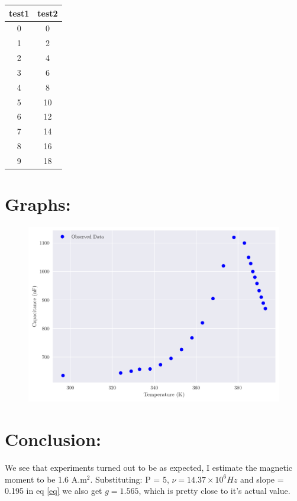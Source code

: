 \documentclass{../_layouts/ieeeconf}
\begin{document}
\begin{table}[H]
    \centering
    \begin{tabular}{@{}cc@{}}
        \toprule
        ﻿test1 & test2 \\
        \midrule
        0 & 0 \\
        1 & 2 \\
        2 & 4 \\
        3 & 6 \\
        4 & 8 \\
        5 & 10 \\
        6 & 12 \\
        7 & 14 \\
        8 & 16 \\
        9 & 18 \\
        \bottomrule
    \end{tabular}
\end{table}
\section{Graphs:}
\begin{figure}[H]
\centering
\includegraphics[width = \columnwidth]{../_assets/Capacitance.pdf}
\end{figure}
\section{Conclusion:}
We see that experiments turned out to be as expected, I estimate the magnetic moment to be 1.6 A.m\(^2\). Substituting: P = 5, \(\nu = 14.37 \times 10^6 Hz\) and slope = 0.195 in eq \ref{eq} we also get \(g = 1.565\), which is pretty close to it's actual value.
\end{document}

